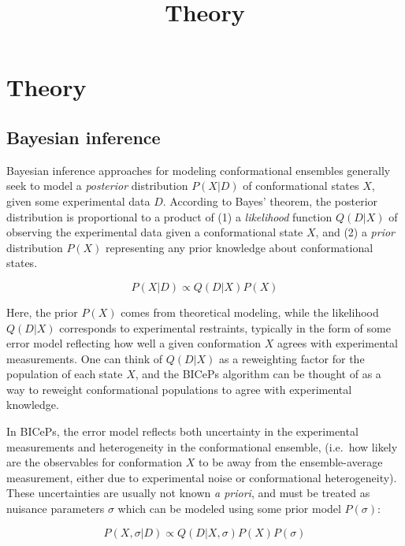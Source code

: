 \documentclass[11pt]{article}
\title{Theory}
\begin{document}
    
    
    \maketitle
    
    

    
    \hypertarget{theory}{%
\section{Theory}\label{theory}}

\hypertarget{bayesian-inference}{%
\subsection{Bayesian inference}\label{bayesian-inference}}

Bayesian inference approaches for modeling conformational ensembles
generally seek to model a \emph{posterior} distribution \(P(X|D)\) of
conformational states \(X\), given some experimental data \(D\).
According to Bayes' theorem, the posterior distribution is proportional
to a product of (1) a \emph{likelihood} function \(Q(D|X)\) of observing
the experimental data given a conformational state \(X\), and (2) a
\emph{prior} distribution \(P(X)\) representing any prior knowledge
about conformational states.

\[P(X|D) \propto Q(D|X) P(X) \tag{1} \]

Here, the prior \(P(X)\) comes from theoretical modeling, while the
likelihood \(Q(D|X)\) corresponds to experimental restraints, typically
in the form of some error model reflecting how well a given conformation
\(X\) agrees with experimental measurements. One can think of \(Q(D|X)\)
as a reweighting factor for the population of each state \(X\), and the
BICePs algorithm can be thought of as a way to reweight conformational
populations to agree with experimental knowledge.

In BICePs, the error model reflects both uncertainty in the experimental
measurements and heterogeneity in the conformational ensemble, (i.e.~how
likely are the observables for conformation \(X\) to be away from the
ensemble-average measurement, either due to experimental noise or
conformational heterogeneity). These uncertainties are usually not known
\emph{a priori}, and must be treated as nuisance parameters \(\sigma\)
which can be modeled using some prior model \(P(\sigma)\):

\[P(X,\sigma | D) \propto Q(D|X,\sigma) P(X) P(\sigma)\tag{2}\]
\end{document}
